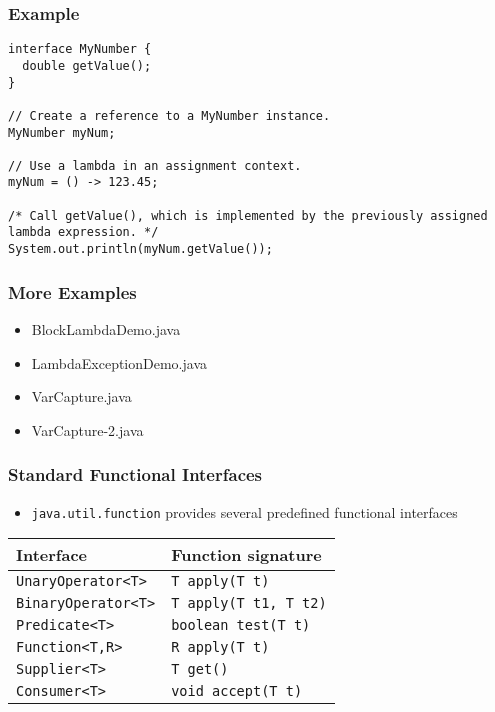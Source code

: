 \documentclass{beamer}
\begin{document}
\begin{frame}[fragile]
\frametitle{Example}

\begin{lstlisting}
interface MyNumber {
  double getValue();
}

// Create a reference to a MyNumber instance.
MyNumber myNum;

// Use a lambda in an assignment context.
myNum = () -> 123.45;

/* Call getValue(), which is implemented by the previously assigned lambda expression. */
System.out.println(myNum.getValue());

\end{lstlisting}
\end{frame}


\begin{frame}[fragile]
\frametitle{More Examples}

\begin{itemize}
  \item <1-> BlockLambdaDemo.java
  \item <2-> LambdaExceptionDemo.java
  \item <3-> VarCapture.java
  \item <4-> VarCapture-2.java

\end{itemize}

\end{frame}

\begin{frame}[fragile]
\frametitle{Standard Functional Interfaces }
\begin{itemize}
\item \texttt{java.util.function} provides several predefined functional interfaces
\end{itemize}

\begin{table}
\begin{tabular}{|l    l|} \hline

\textbf{Interface} & \textbf{Function signature} \\ \hline
\texttt{UnaryOperator<T>}  & \texttt{T	apply(T	t)} \\
\texttt{BinaryOperator<T>} & \texttt{T	apply(T	t1, T	t2)} \\
\texttt{Predicate<T>}      & \texttt{boolean test(T	t)} \\  
\texttt{Function<T,R>}     & \texttt{R	apply(T	t)} \\ 
\texttt{Supplier<T>}       & \texttt{T	get()} \\ 
\texttt{Consumer<T>}       & \texttt{void	accept(T t)} \\ \hline

\end{tabular}
\end{table}
\end{frame}
\end{document}
